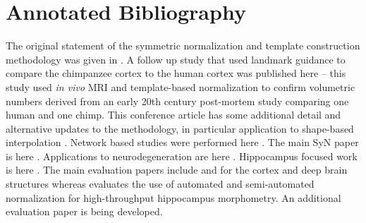\documentclass{InsightArticle}
\begin{document}
\section{Annotated Bibliography}
The original statement of the symmetric normalization and template
construction methodology was given in \cite{Avants2004}.  A follow up
study that used landmark guidance to compare the chimpanzee cortex to
the human cortex was published here \cite{Avants2006} -- this study
used {\em in vivo} MRI and template-based normalization to confirm
volumetric numbers derived from an early 20th century post-mortem
study comparing one human and one chimp.  This conference article has
some additional detail and alternative updates to the methodology, in
particular application to shape-based interpolation
\cite{Avants2005b}.  Network based studies were performed here
\cite{duda08miccai,duda08cvpr}.  The main SyN paper is here
\cite{Avants2008}.  Applications to neurodegeneration are here
\cite{Avants2005,Avants2008a,Grossman2008,Avants2009,Das2009,Yushkevich2009,Massimo2009}.
Hippocampus focused work is here \cite{Pluta2009,Yushkevich2009}.  The
main evaluation papers include \cite{Avants2008} and \cite{Klein2009}
for the cortex and deep brain structures whereas \cite{Pluta2009}
evaluates the use of automated and semi-automated normalization for
high-throughput hippocampus morphometry.  An additional evaluation
paper is being developed.  


%
%



\end{document}
